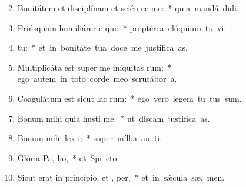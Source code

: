 \begin{flushleft}
\begin{enumerate}[leftmargin=*]
\setcounter{enumi}{1}

\item Bonitátem et disciplínam et scién ce me:~* \mbox{quia mandá  didi.}
\item Priúsquam humiliárer e qui:~* \mbox{proptérea elóquium tu vi.}
\item {}  tu:~* \mbox{et in bonitáte tua doce me justifica as.}
\item Multiplicáta est super me iníquitas rum:~* \mbox{ego autem in toto corde meo scrutábor  a.}
\item Coagulátum est sicut lac  rum:~* \mbox{ego vero legem tu tus sum.}
\item Bonum mihi quia husti me:~* \mbox{ut discam justifica as.}
\item Bonum mihi lex  i:~* \mbox{super míllia au  ti.}
\item Glória Pa,  lio,~* \mbox{et Spi cto.}
\item Sicut erat in princípio, et ,  per,~* \mbox{et in s\'{\ae}cula sæ. men.}


\end{enumerate}
\end{flushleft}

